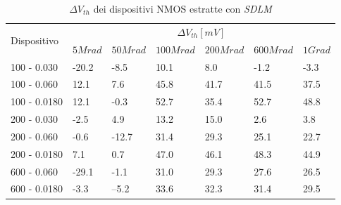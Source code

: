 \documentclass[
	a4paper,
	cleardoublepage=empty,
	headings=twolinechapter,
	numbers=autoenddot,
]{scrbook}
\begin{document}
\begin{table}[H]
  \renewcommand{\arraystretch}{1.3}
  \begin{tabular}{m{2.1cm}  m{1.1cm} m{1.3cm} m{1.5cm} m{1.5cm} m{1.5cm} m{1cm}}
    \toprule
    \multirow{2}{*}{Dispositivo} & \multicolumn{6}{c}{$\Delta V_{th} [mV] $}                                                          \\
    \cmidrule{2-7}
                                 & $5Mrad$                                   & $50Mrad$ & $100Mrad$ & $200Mrad$ & $600Mrad$ & $1Grad$ \\
    \midrule
    100 - 0.030                     & -20.2                                     & -8.5     & 10.1      & 8.0       & -1.2      & -3.3        \\
    \hline
    100 - 0.060                     & 12.1                                      & 7.6      & 45.8      & 41.7      & 41.5      & 37.5        \\
    \hline
    100 - 0.0180                    & 12.1                                      & -0.3     & 52.7      & 35.4      & 52.7      & 48.8        \\
    \hline
    200 - 0.030                     & -2.5                                      & 4.9      & 13.2      & 15.0      & 2.6       &  3.8       \\
    \hline
    200 - 0.060                     & -0.6                                      & -12.7    & 31.4      & 29.3      & 25.1      & 22.7        \\
    \hline
    200 - 0.0180                    & 7.1                                       & 0.7      & 47.0      & 46.1      & 48.3      & 44.9        \\
    \hline
    600 - 0.060                     & -29.1                                     & -1.1     & 31.0      & 29.3      & 27.6      & 26.5        \\
    \hline
    600 - 0.0180                    & -3.3                                      & --5.2    & 33.6      & 32.3      & 31.4      & 29.5        \\
    \bottomrule
  \end{tabular}
  \caption{$\Delta V_{th}$ dei dispositivi NMOS estratte con \emph{SDLM}}
  \label{tab:deltaVthSDLMN}
\end{table}
\end{document}
